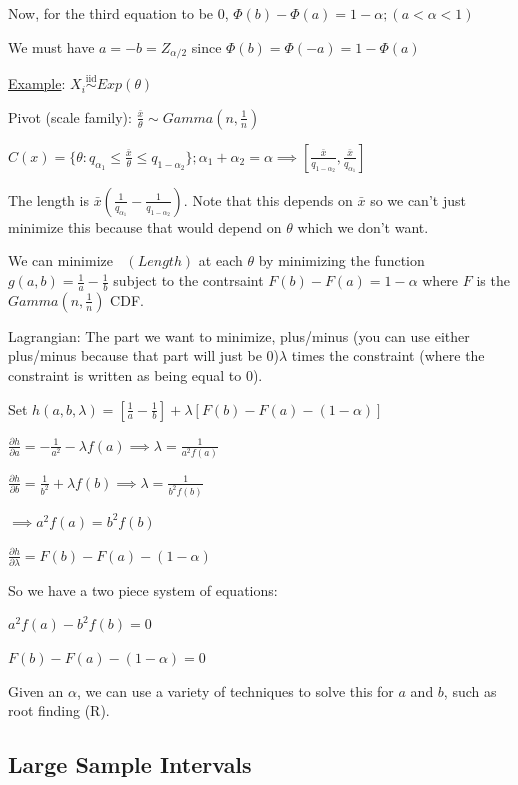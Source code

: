 \documentclass{article}
\DeclareMathOperator{\EX}{\mathbb{E}} %
\DeclareMathOperator{\ext}{\EX_{\theta}} %
\newcommand{\iiddist}{\overset{\mathrm{iid}}{\sim}}
\begin{document}
Now, for the third equation to be 0, $\Phi(b) - \Phi(a) = 1-\alpha; (a < \alpha < 1)$

We must have $a = -b = Z_{\alpha/2}$ since $\Phi(b) = \Phi(-a) = 1 - \Phi(a)$


\underline{Example}: $X_i \iiddist Exp(\theta)$

Pivot (scale family): $\frac{\bar{x}}{\theta} \sim Gamma(n, \frac{1}{n})$

$C(x) = \{\theta:q_{\alpha_1} \le \frac{\bar{x}}{\theta} \le q_{1-\alpha_2}\}; \alpha_1 + \alpha_2 = \alpha \implies \left[\frac{\bar{x}}{q_{1-\alpha_2}}, \frac{\bar{x}}{q_{\alpha_1}}\right]$

The length is $\bar{x}(\frac{1}{q_{\alpha_1}} - \frac{1}{q_{1-\alpha_2}})$. Note that this depends on $\bar{x}$ so we can't just minimize this because that would depend on $\theta$ which we don't want. 

We can minimize $\ext(Length)$ at each $\theta$ by minimizing the function $g(a,b) = \frac{1}{a}-\frac{1}{b}$ subject to the contrsaint $F(b)-F(a) = 1-\alpha$ where $F$ is the $Gamma(n,\frac{1}{n})$ CDF.

Lagrangian: The part we want to minimize, plus/minus (you can use either plus/minus because that part will just be 0)$\lambda$ times the constraint (where the constraint is written as being equal to 0).

Set $h(a,b,\lambda) = [\frac{1}{a} - \frac{1}{b}] + \lambda[F(b) - F(a) - (1-\alpha)]$

$\frac{\partial h}{\partial a} = -\frac{1}{a^2} - \lambda f(a) \implies \lambda = \frac{1}{a^2 f(a)}$

$\frac{\partial h}{\partial b} = \frac{1}{b^2} + \lambda f(b) \implies \lambda = \frac{1}{b^2 f(b)}$

$\implies a^2 f(a) = b^2 f(b)$

$\frac{\partial h}{\partial \lambda} = F(b) - F(a) - (1-\alpha)$

So we have a two piece system of equations:

$a^2 f(a) - b^2 f(b) = 0$

$F(b) - F(a) - (1-\alpha) = 0$

Given an $\alpha$, we can use a variety of techniques to solve this for $a$ and $b$, such as root finding (R). 

\subsection{Large Sample Intervals}
\end{document}

